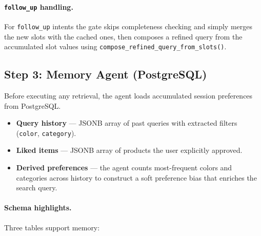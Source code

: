 \documentclass[12pt,a4paper]{article}
\begin{document}
\paragraph{\texttt{follow\_up} handling.}
For \texttt{follow\_up} intents the gate skips completeness checking
and simply merges the new slots with the cached ones, then composes
a refined query from the accumulated slot values using
\texttt{compose\_refined\_query\_from\_slots()}.

\subsection{Step 3: Memory Agent (PostgreSQL)}

Before executing any retrieval, the agent loads accumulated session
preferences from PostgreSQL.

\begin{itemize}[leftmargin=*]
  \item \textbf{Query history} --- JSONB array of past queries with
        extracted filters (\texttt{color}, \texttt{category}).
  \item \textbf{Liked items} --- JSONB array of products the user
        explicitly approved.
  \item \textbf{Derived preferences} --- the agent counts most-frequent
        colors and categories across history to construct a soft
        preference bias that enriches the search query.
\end{itemize}

\paragraph{Schema highlights.}
Three tables support memory:

\begin{center}
\end{center}
\end{document}
